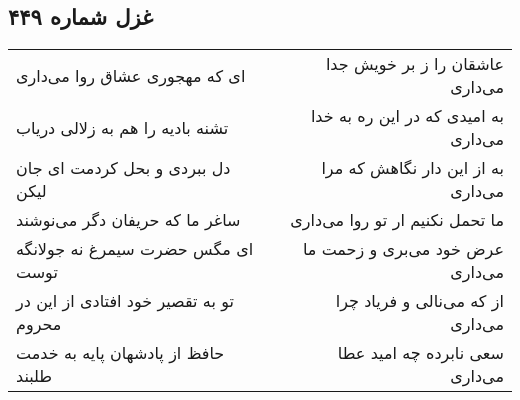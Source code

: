 \begin{center}
\section*{غزل شماره ۴۴۹}
\label{sec:sh449}
\begin{longtable}{l p{0.5cm} r}
ای که مهجوری عشاق روا می‌داری
&&
عاشقان را ز بر خویش جدا می‌داری
\\
تشنه بادیه را هم به زلالی دریاب
&&
به امیدی که در این ره به خدا می‌داری
\\
دل ببردی و بحل کردمت ای جان لیکن
&&
به از این دار نگاهش که مرا می‌داری
\\
ساغر ما که حریفان دگر می‌نوشند
&&
ما تحمل نکنیم ار تو روا می‌داری
\\
ای مگس حضرت سیمرغ نه جولانگه توست
&&
عرض خود می‌بری و زحمت ما می‌داری
\\
تو به تقصیر خود افتادی از این در محروم
&&
از که می‌نالی و فریاد چرا می‌داری
\\
حافظ از پادشهان پایه به خدمت طلبند
&&
سعی نابرده چه امید عطا می‌داری
\\
\end{longtable}
\end{center}
